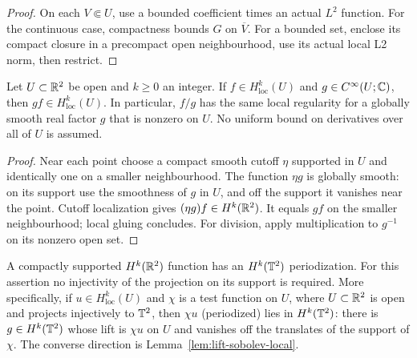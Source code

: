\begin{proof}
\leanok
On each $V\Subset U$, use a bounded coefficient times an actual $L^2$ function.
For the continuous case, compactness bounds $G$ on $\overline V$.
For a bounded set, enclose its compact closure in a precompact open
neighbourhood, use its actual local L2 norm, then restrict.
\end{proof}

\begin{lemma}
\label{lem:sobolev-local-multiplier}
\leanok
Let $U\subset\mathbb{R}^2$ be open and $k\ge0$ an integer.
If $f\in H^k_{\mathrm{loc}}(U)$ and $g\in C^\infty(U;\mathbb{C})$, then
$gf\in H^k_{\mathrm{loc}}(U)$.
In particular, $f/g$ has the same local regularity for a globally
smooth real factor $g$ that is nonzero on $U$.
No uniform bound on derivatives over all of $U$ is assumed.
\end{lemma}

\begin{proof}
\leanok
Near each point choose a compact smooth cutoff $\eta$ supported in $U$
and identically one on a smaller neighbourhood. The function $\eta g$
is globally smooth: on its support use the smoothness of $g$ in $U$,
and off the support it vanishes near the point.
Cutoff localization gives $(\eta g)f\in H^k(\mathbb{R}^2)$.
It equals $gf$ on the smaller neighbourhood; local gluing concludes.
For division, apply multiplication to $g^{-1}$ on its nonzero open set.
\end{proof}

\begin{lemma}[Localization]
\label{lem:local-to-global}
\leanok
A compactly supported $H^k(\mathbb{R}^2)$ function has an $H^k(\mathbb{T}^2)$ periodization.
For this assertion no injectivity of the projection on its support is required.
More specifically, if $u\in H^k_{\mathrm{loc}}(U)$ and $\chi$ is a test function on $U$, where $U\subset\mathbb{R}^2$ is
open and projects injectively to $\mathbb{T}^2$, then $\chi u$ (periodized) lies in $H^k(\mathbb{T}^2)$: there
is $g\in H^k(\mathbb{T}^2)$ whose lift is $\chi u$ on $U$ and vanishes off the translates of the
support of $\chi$. The converse direction is Lemma~\ref{lem:lift-sobolev-local}.
\end{lemma}


